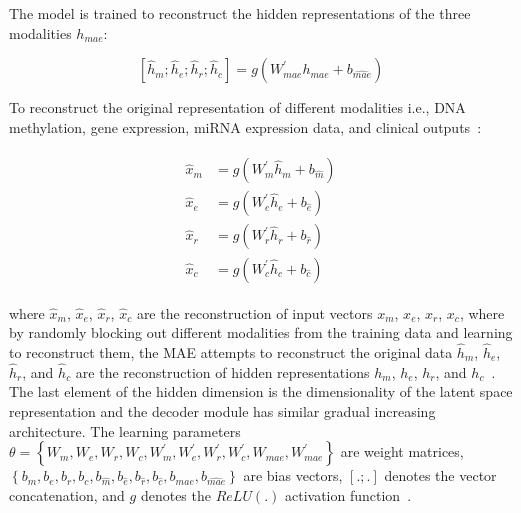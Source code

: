 The model is trained to reconstruct the hidden representations of the three modalities $h_{mae}$:

\vspace{-4mm}
\begin{equation}
    \left[\hat{h}_{m} ; \hat{h}_{e} ; \hat{h}_{r} ; \hat{h}_{c} \right]=g\left(W_{mae}^{\prime} h_{mae}+b_{\hat{mae}}\right)
\end{equation}

To reconstruct the original representation of different modalities i.e., DNA methylation, gene expression, miRNA expression data, and clinical outputs~\cite{wang2018associativemulti}: 

\vspace{-4mm}
\begin{align}
    \begin{aligned}
        \hat{x}_{m} &=g\left(W_{m}^{\prime} \hat{h}_{m}+b_{\hat{m}}\right) \\
        \hat{x}_{e} &=g\left(W_{e}^{\prime} \hat{h}_{e}+b_{\hat{e}}\right) \\
        \hat{x}_{r} &=g\left(W_{r}^{\prime} \hat{h}_{r}+b_{\hat{r}}\right) \\
        \hat{x}_{c} &=g\left(W_{c}^{\prime} \hat{h}_{c}+b_{\hat{c}}\right)
        \end{aligned}
\end{align}

where $\hat{x}_{m}$, $\hat{x}_{e}$,  $\hat{x}_{r}$, $\hat{x}_{c}$ are the reconstruction of input vectors $x_{m}$, $x_{e}$, $x_{r}$, $x_{c}$, where by randomly blocking out different modalities from the training data and learning to reconstruct them, the MAE attempts to reconstruct the original data $\hat{h}_{m}$, $\hat{h}_{e}$, $\hat{h}_{r}$, and $\hat{h}_{c}$ are the reconstruction of hidden representations ${h}_{m}$, ${h}_{e}$, ${h}_{r}$, and ${h}_{c}$~\cite{wang2018associativemulti}. The last element of the hidden dimension is the dimensionality of the latent space representation and the decoder module has similar gradual increasing architecture. The learning parameters $   \theta=\left\{W_{m},W_{e},W_{r},W_{c},W_{m}^{\prime},W_{e}^{\prime},W_{r}^{\prime},W_{c}^{\prime},W_{mae},W_{mae}^{\prime}\right\}$ are weight matrices, $\left\{b_{m}, b_{e}, b_{r}, b_{c}, b_{\hat{m}}, b_{\hat{e}}, b_{\hat{r}}, b_{\hat{c}}, b_{mae}, b_{\hat{mae}}\right\}$ are bias vectors, $[.;.]$ denotes the vector concatenation, and $g$ denotes the $ReLU(.)$ activation function~\cite{wang2018associativemulti}. 

